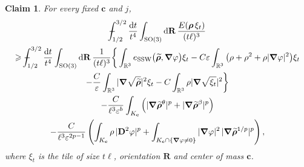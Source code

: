 \documentclass[final,reqno]{amsart}
\newtheorem*{claim}{Claim}
\theoremstyle{remark}
\renewcommand{\ge}{\geqslant}
\renewcommand{\epsilon}{\varepsilon}
\newcommand{\wt}[1]{\widetilde{#1}}
\newcommand{\RR}{\mathbb{R}}
\newcommand{\SO}{\mathrm{SO}}
\newcommand{\SSW}{\mathrm{SSW}}
\newcommand{\grad}{\bm{\nabla}}
\newcommand{\dd}{\mathrm{d}}
\def\Xint#1{\mathchoice
{\XXint\displaystyle\textstyle{#1}}
{\XXint\textstyle\scriptstyle{#1}}
{\XXint\scriptstyle\scriptscriptstyle{#1}}
{\XXint\scriptscriptstyle\scriptscriptstyle{#1}}
\!\int}
\def\XXint#1#2#3{{\setbox0=\hbox{$#1{#2#3}{\int}$ }
\vcenter{\hbox{$#2#3$ }}\kern-.6\wd0}}
\def\dashint{\Xint-}
\begin{document}
\begin{claim}
For every fixed $\mathbf{c}$ and $j$,
\begin{multline}\label{eq:estim_local_lower_SSW}
\dashint_{1/2}^{3/2}\frac{\dd t}{t^4}\int_{\SO(3)}\dd\mathbf{R}\,\frac{E(\bm{\rho}\,\xi_t)}{(t\ell)^3}\\
\ge\dashint_{1/2}^{3/2}\frac{\dd t}{t^4}\int_{\SO(3)}\dd\mathbf{R}\,\frac{1}{(t\ell)^3}\bigg\{\int_{\RR^3}e_\SSW\big(\wt{\bm{\rho}},\grad\varphi\big)\xi_t-C\epsilon\int_{\RR^3}\big(\rho+\rho^2+\rho|\grad\varphi|^2\big)\xi_t\\
-\frac C\epsilon\int_{\RR^3}|\grad\sqrt{\wt{\bm{\rho}}}|^2\xi_t-C\int_{\RR^3}\rho|\grad\sqrt{\xi_t}|^2\bigg\}\\
-\frac{C}{\ell^3\epsilon^b}\int_{K_{\mathbf{c}}}\Big(|\grad\wt{\bm{\rho}}^\theta|^p+|\grad\wt{\bm{\rho}}^\beta|^p\Big)\\
-\frac{C}{\ell^3\epsilon^{2p-1}}\left(\int_{K_{\mathbf{c}}}\rho\,|\mathbf{D}^2\varphi|^p
+\int_{K_{\mathbf{c}}\cap\{\grad\varphi\ne0\}}|\grad\varphi|^2\,|\grad\wt{\bm{\rho}}^{1/p}|^p\right),
\end{multline}
where $\xi_t$ is the tile of size $t\ell$, orientation $\mathbf{R}$ and center of mass $\mathbf{c}$.
\end{claim}
\end{document}
